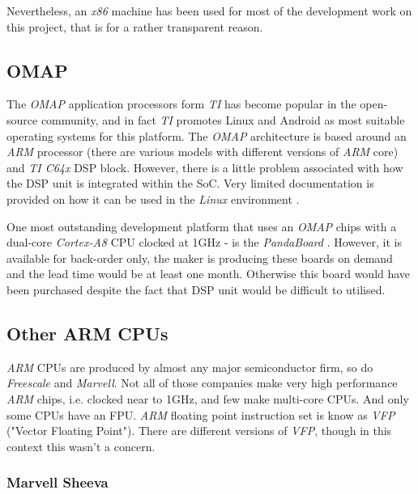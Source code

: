   Nevertheless, an \emph{x86} machine has been used for most of the
 development work on this project, that is for a rather transparent
 reason.


\subsection{OMAP}

  The \emph{OMAP} application processors form \emph{TI} has become
 popular in the open-source community, and in fact \emph{TI} promotes
 Linux and Android as most suitable operating systems for this platform.
 The \emph{OMAP} architecture is based around an \emph{ARM} processor
 (there are various models with different versions of \emph{ARM} core)
 and \emph{TI C64x} DSP block. However, there is a little problem
 associated with how the DSP unit is integrated within the SoC.
 Very limited documentation is provided on how it can be used in the
 \emph{Linux} environment \cite{ti:omap:wiki:dsp}.

 One most outstanding development platform that uses an \emph{OMAP}
 chips with a dual-core \emph{Cortex-A8} CPU clocked at 1GHz - is the
 \emph{PandaBoard} \cite{ti:omap:wiki:pb}. However, it is available
 for back-order only, the maker is producing these boards on demand
 and the lead time would be at least one month. Otherwise this board
 would have been purchased despite the fact that DSP unit would be
 difficult to utilised.


\subsection{Other ARM CPUs}

  \emph{ARM} CPUs are produced by almost any major semiconductor firm,
 so do \emph{Freescale} and \emph{Marvell}. Not all of those companies
 make very high performance \emph{ARM} chips, i.e. clocked near to 1GHz,
 and few make multi-core CPUs. And only some CPUs have an FPU.
 \emph{ARM} floating point instruction set is know as \emph{VFP}
 ("Vector Floating Point"). There are different versions of \emph{VFP},
 though in this context this wasn't a concern.

\subsubsection{Marvell Sheeva}

